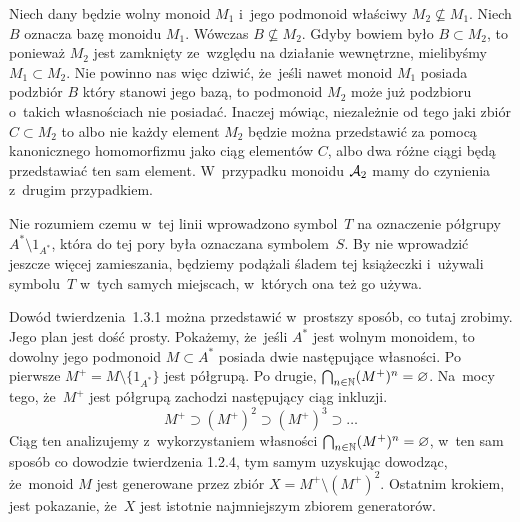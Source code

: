 \documentclass[a4paper,11pt]{article}
\begin{document}
Niech dany będzie wolny monoid $M_{ 1 }$ i~jego podmonoid właściwy
$M_{ 2 } \nsubseteq M_{ 1 }$. Niech $B$ oznacza bazę monoidu
$M_{ 1 }$. Wówczas $B \nsubseteq M_{ 2 }$. Gdyby bowiem było
$B \subset M_{ 2 }$, to ponieważ $M_{ 2 }$ jest zamknięty ze~względu
na działanie wewnętrzne, mielibyśmy $M_{ 1 } \subset M_{ 2 }$. Nie
powinno nas więc dziwić, że~jeśli nawet monoid $M_{ 1 }$ posiada
podzbiór $B$ który stanowi jego bazą, to podmonoid $M_{ 2 }$ może już
podzbioru o~takich własnościach nie posiadać. Inaczej mówiąc,
niezależnie od tego jaki zbiór $C \subset M_{ 2 }$ to albo nie każdy
element $M_{ 2 }$ będzie można przedstawić za pomocą kanonicznego
homomorfizmu jako ciąg elementów $C$, albo dwa różne ciągi będą
przedstawiać ten sam element. W~przypadku monoidu $\mathcal{A}_{ 2 }$ mamy
do czynienia z~drugim przypadkiem.

\vspace{\spaceFour}





\start {} Nie rozumiem czemu w~tej linii wprowadzono
symbol~$T$ na oznaczenie półgrupy $A^{ * } \setminus 1_{ A^{ * } }$,
która do tej pory była oznaczana symbolem~$S$. By nie wprowadzić
jeszcze więcej zamieszania, będziemy podążali śladem tej książeczki
i~używali symbolu~$T$ w~tych samych miejscach, w~których ona też go
używa.

\vspace{\spaceFour}





\start {} Dowód twierdzenia~1.3.1 można przedstawić w~prostszy
sposób, co tutaj zrobimy. Jego plan jest dość prosty. Pokażemy,
że~jeśli $A^{ * }$ jest wolnym monoidem, to dowolny jego podmonoid
$M \subset A^{ * }$ posiada dwie następujące własności. Po pierwsze
$M^{ + } = M \setminus \{ 1_{ A^{ * } } \}$ jest półgrupą. Po drugie,
$\bigcap_{ n \in \mathbb{N} } ( M^{ + } )^{ n } = \varnothing$. Na~mocy tego,
że~$M^{ + }$ jest półgrupą zachodzi następujący ciąg inkluzji.
\begin{equation}
  \label{eq:Forys-Forys-66}
  M^{ + } \supset ( M^{ + } )^{ 2 } \supset ( M^{ + } )^{ 3 } \supset \ldots
\end{equation}
Ciąg ten analizujemy z~wykorzystaniem własności
$\bigcap_{ n \in \mathbb{N} } ( M^{ + } )^{ n } = \varnothing$, w~ten sam
sposób co dowodzie twierdzenia 1.2.4, tym samym uzyskując dowodząc,
że~monoid $M$ jest generowane przez zbiór
$X = M^{ + } \setminus ( M^{ + } )^{ 2 }$. Ostatnim krokiem, jest pokazanie,
że~$X$ jest istotnie najmniejszym zbiorem generatorów.
\end{document}
